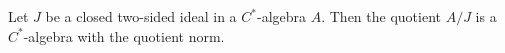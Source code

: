 Let $J$ be a closed two-sided ideal in a $C^*$-algebra $A$. Then the quotient $A/J$ is a $C^*$-algebra with the quotient norm.
